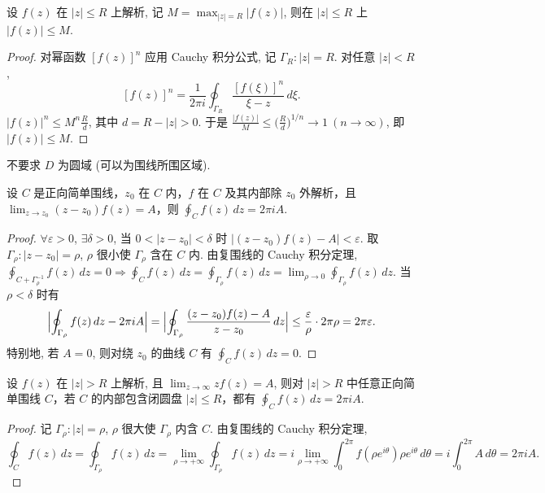 \documentclass[theorem=false,mathfont=none,openany,sub3section]{easybook}
\begin{document}
\begin{example}
  设 $f(z)$ 在 $|z|\leq R$ 上解析, 记
  $M=\max_{|z|=R}|f(z)|$, 则在 $|z|\leq R$ 上 $|f(z)|\leq M$.
  \begin{proof}
    对幂函数 $[f(z)]^{n}$ 应用 Cauchy 积分公式, 记 $\Gamma_{R}:|z|=R$.
    对任意 $|z|<R$,
    \[
    [f(z)]^{n}=\frac{1}{2\pi i}\oint_{\Gamma_{R}}\frac{[f(\xi)]^{n}}{\xi-z}\,d\xi.
    \]
    $|f(z)|^{n}\leq M^{n}\frac{R}{d}$, 其中 $d=R-|z|>0$.
    于是 $\frac{|f(z)|}{M}\leq\bigl(\frac{R}{d}\bigr)^{1/n}\to1\ (n\to\infty)$, 即 $|f(z)|\leq M$.
  \end{proof}
  \begin{remark}
    不要求 $D$ 为圆域 (可以为围线所围区域).
  \end{remark}
\end{example}

\begin{example}
  设 $C$ 是正向简单围线，$z_0$ 在 $C$ 内，$f$ 在 $C$ 及其内部除
  $z_{0}$ 外解析，且 $\lim_{z\to z_{0}}(z-z_{0})f(z)=A$，则
  $\oint_{C}f(z)\,dz=2\pi iA$.
  \begin{proof}
    $\forall\varepsilon>0$, $\exists\delta>0$, 当 $0<|z-z_{0}|<\delta$ 时 $|(z-z_{0})f(z)-A|<\varepsilon$.
    取 $\Gamma_{\rho}:|z-z_{0}|=\rho$, $\rho$ 很小使 $\Gamma_{\rho}$ 含在 $C$ 内.
    由复围线的 Cauchy 积分定理, $\oint_{C+\Gamma_{\rho}^{-1}}f(z)\,dz=0\Rightarrow\oint_{C}f(z)\,dz=\oint_{\Gamma_{\rho}}f(z)\,dz=\lim_{\rho\to0}\oint_{\Gamma_{\rho}}f(z)\,dz$.
    当 $\rho<\delta$ 时有
    \[
    \Bigl|\oint_{\Gamma_{\rho}}f(z)\,dz-2\pi iA\Bigr|
    =\Bigl|\oint_{\Gamma_{\rho}}\frac{(z-z_{0})f(z)-A}{z-z_{0}}\,dz\Bigr|
    \leq\frac{\varepsilon}{\rho}\cdot2\pi\rho=2\pi\varepsilon.
    \]
    特别地, 若 $A=0$, 则对绕 $z_{0}$ 的曲线 $C$ 有 $\oint_{C}f(z)\,dz=0$.
  \end{proof}
\end{example}

\begin{example}
  设 $f(z)$ 在 $|z|>R$ 上解析, 且 $\lim_{z\to\infty}zf(z)=A$, 则对
  $|z|>R$ 中任意正向简单围线 $C$，若 $C$ 的内部包含闭圆盘
  $|z|\leq R$，都有 $\oint_{C}f(z)\,dz=2\pi iA$.
  \begin{proof}
    记 $\Gamma_{\rho}:|z|=\rho$, $\rho$ 很大使 $\Gamma_{\rho}$ 内含 $C$. 由复围线的 Cauchy 积分定理,
    \[
    \oint_{C}f(z)\,dz=\oint_{\Gamma_{\rho}}f(z)\,dz
    =\lim_{\rho\to+\infty}\oint_{\Gamma_{\rho}}f(z)\,dz
    =i\lim_{\rho\to+\infty}\int_{0}^{2\pi}f(\rho e^{i\theta})\rho e^{i\theta}\,d\theta
    =i\int_{0}^{2\pi}A\,d\theta=2\pi iA.
    \]
  \end{proof}
\end{example}
\end{document}
